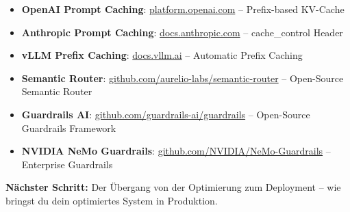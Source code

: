 \begin{itemize}[leftmargin=*]
    \item \textbf{OpenAI Prompt Caching}: \href{https://platform.openai.com/docs/guides/prompt-caching}{platform.openai.com} -- Prefix-based KV-Cache
    \item \textbf{Anthropic Prompt Caching}: \href{https://docs.anthropic.com/en/docs/build-with-claude/prompt-caching}{docs.anthropic.com} -- cache\_control Header
    \item \textbf{vLLM Prefix Caching}: \href{https://docs.vllm.ai/en/latest/features/automatic_prefix_caching.html}{docs.vllm.ai} -- Automatic Prefix Caching
    \item \textbf{Semantic Router}: \href{https://github.com/aurelio-labs/semantic-router}{github.com/aurelio-labs/semantic-router} -- Open-Source Semantic Router
    \item \textbf{Guardrails AI}: \href{https://github.com/guardrails-ai/guardrails}{github.com/guardrails-ai/guardrails} -- Open-Source Guardrails Framework
    \item \textbf{NVIDIA NeMo Guardrails}: \href{https://github.com/NVIDIA/NeMo-Guardrails}{github.com/NVIDIA/NeMo-Guardrails} -- Enterprise Guardrails
\end{itemize}

\textbf{Nächster Schritt:} Der Übergang von der Optimierung zum Deployment -- wie bringst du dein optimiertes System in Produktion.
